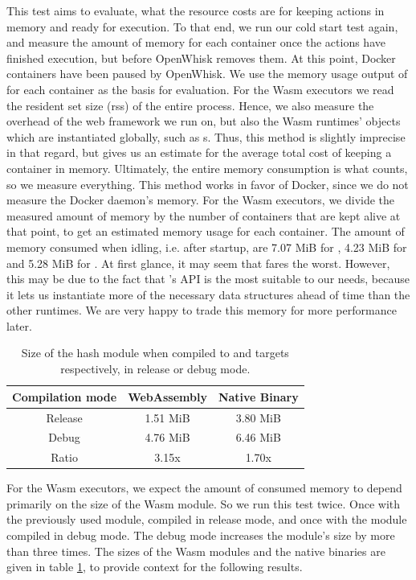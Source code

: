 This test aims to evaluate, what the resource costs are for keeping actions in memory and ready for execution.
To that end, we run our cold start test again, and measure the amount of memory for each container once the actions have finished execution, but before OpenWhisk removes them. At this point, Docker containers have been paused by OpenWhisk. We use the memory usage output of  for each container as the basis for evaluation. For the Wasm executors we read the resident set size (rss) of the entire process. Hence, we also measure the overhead of the web framework we run on, but also the Wasm runtimes' objects which are instantiated globally, such as s. Thus, this method is slightly imprecise in that regard, but gives us an estimate for the average total cost of keeping a container in memory. Ultimately, the entire memory consumption is what counts, so we measure everything. This method works in favor of Docker, since we do not measure the Docker daemon's memory.
For the Wasm executors, we divide the measured amount of memory by the number of containers that are kept alive at that point, to get an estimated memory usage for each container. The amount of memory consumed when idling, i.e. after startup, are 7.07 MiB for , 4.23 MiB for  and 5.28 MiB for . At first glance, it may seem that  fares the worst. However, this may be due to the fact that 's API is the most suitable to our needs, because it lets us instantiate more of the necessary data structures ahead of time than the other runtimes. We are very happy to trade this memory for more performance later.

\begin{table}[h!]
    \centering
    \begin{tabular}{c | c | c}
        Compilation mode & WebAssembly & Native Binary\\
        \hline
        Release & 1.51 MiB & 3.80 MiB\\
        Debug   & 4.76 MiB & 6.46 MiB\\
        \hline
        Ratio   & 3.15x    & 1.70x\\
    \end{tabular}
    \caption{Size of the hash module when compiled to  and  targets respectively, in release or debug mode.}
    \label{table:hash-binary-size}
\end{table}

For the Wasm executors, we expect the amount of consumed memory to depend primarily on the size of the Wasm module. So we run this test twice. Once with the previously used  module, compiled in release mode, and once with the module compiled in debug mode. The debug mode increases the module's size by more than three times. The sizes of the Wasm modules and the native binaries are given in table \ref{table:hash-binary-size}, to provide context for the following results.

